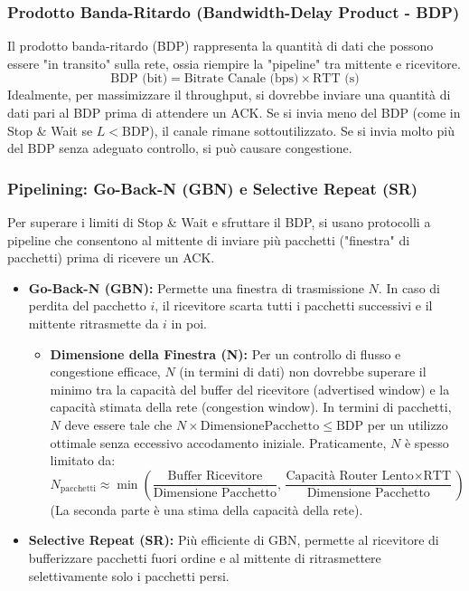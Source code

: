 \subsubsection{Prodotto Banda-Ritardo (Bandwidth-Delay Product - BDP)}
Il prodotto banda-ritardo (BDP) rappresenta la quantità di dati che possono essere "in transito" sulla rete, ossia riempire la "pipeline" tra mittente e ricevitore.
\[ \text{BDP (bit)} = \text{Bitrate Canale (bps)} \times \text{RTT (s)} \]
Idealmente, per massimizzare il throughput, si dovrebbe inviare una quantità di dati pari al BDP prima di attendere un ACK. Se si invia meno del BDP (come in Stop & Wait se $L < \text{BDP}$), il canale rimane sottoutilizzato. Se si invia molto più del BDP senza adeguato controllo, si può causare congestione.

\subsubsection{Pipelining: Go-Back-N (GBN) e Selective Repeat (SR)}
Per superare i limiti di Stop & Wait e sfruttare il BDP, si usano protocolli a pipeline che consentono al mittente di inviare più pacchetti ("finestra" di pacchetti) prima di ricevere un ACK.
\begin{itemize}
    \item \textbf{Go-Back-N (GBN):} Permette una finestra di trasmissione $N$. In caso di perdita del pacchetto $i$, il ricevitore scarta tutti i pacchetti successivi e il mittente ritrasmette da $i$ in poi.
        \begin{itemize}
            \item \textbf{Dimensione della Finestra (N):} Per un controllo di flusso e congestione efficace, $N$ (in termini di dati) non dovrebbe superare il minimo tra la capacità del buffer del ricevitore (advertised window) e la capacità stimata della rete (congestion window). In termini di pacchetti, $N$ deve essere tale che $N \times \text{DimensionePacchetto} \le \text{BDP}$ per un utilizzo ottimale senza eccessivo accodamento iniziale.
            Praticamente, $N$ è spesso limitato da:
            \[ N_{\text{pacchetti}} \approx \min\left(\frac{\text{Buffer Ricevitore}}{\text{Dimensione Pacchetto}}, \frac{\text{Capacità Router Lento} \times \text{RTT}}{\text{Dimensione Pacchetto}}\right) \]
            (La seconda parte è una stima della capacità della rete).
        \end{itemize}
    \item \textbf{Selective Repeat (SR):} Più efficiente di GBN, permette al ricevitore di bufferizzare pacchetti fuori ordine e al mittente di ritrasmettere selettivamente solo i pacchetti persi.
\end{itemize}

